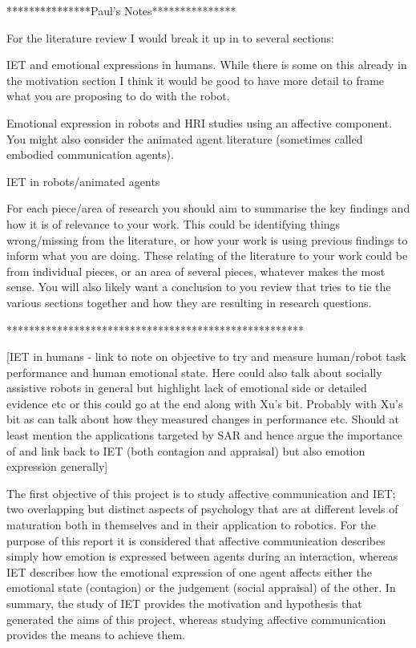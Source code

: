 \documentclass[11pt]{article}
\begin{document}

***************Paul's Notes***************

For the literature review I would break it up in to several sections:

IET and emotional expressions in humans. While there is some on this already in the motivation section I think it would be good to have more detail to frame what you are proposing to do with the robot.

Emotional expression in robots and HRI studies using an affective component. You might also consider the animated agent literature (sometimes called embodied communication agents).

IET in robots/animated agents

For each piece/area of research you should aim to summarise the key findings and how it is of relevance to your work. This could be identifying things wrong/missing from the literature, or how your work is using previous findings to inform what you are doing. These relating of the literature to your work could be from individual pieces, or an area of several pieces, whatever makes the most sense. You will also likely want a conclusion to you review that tries to tie the various sections together and how they are resulting in research questions.

*****************************************************

[IET in humans - link to note on objective to try and measure human/robot task performance and human emotional state. Here could also talk about socially assistive robots in general but highlight lack of emotional side or detailed evidence etc or this could go at the end along with Xu's bit. Probably with Xu's bit as can talk about how they measured changes in performance etc. Should at least mention the applications targeted by SAR and hence argue the importance of and link back to IET (both contagion and appraisal) but also emotion expression generally]

The first objective of this project is to study affective communication and IET; two overlapping but distinct aspects of psychology that are at different levels of maturation both in themselves and in their application to robotics. For the purpose of this report it is considered that affective communication describes simply how emotion is expressed between agents during an interaction, whereas IET describes how the emotional expression of one agent affects either the emotional state (contagion) or the judgement (social appraisal) of the other. In summary, the study of IET provides the motivation and hypothesis that generated the aims of this project, whereas studying affective communication provides the means to achieve them. 
\end{document}
